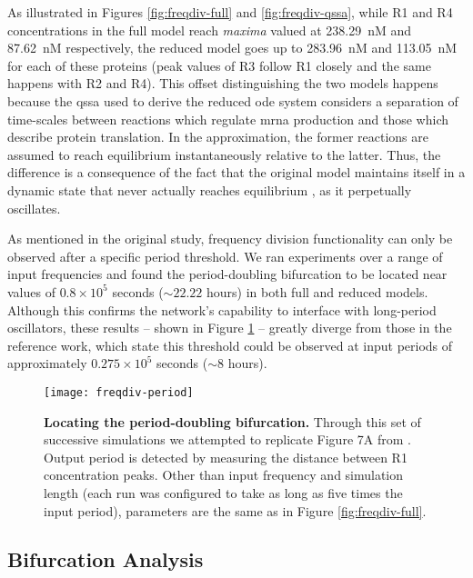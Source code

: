     As illustrated in Figures \ref{fig:freqdiv-full} and \ref{fig:freqdiv-qssa}, while R1 and R4 concentrations in the full model reach \textit{maxima} valued at \SI{238.29}{\nano M} and \SI{87.62}{\nano M} respectively, the reduced model goes up to \SI{283.96}{\nano M} and \SI{113.05}{\nano M} for each of these proteins (peak values of R3 follow R1 closely and the same happens with R2 and R4).
    This offset distinguishing the two models happens because the \ac{qssa} used to derive the reduced \ac{ode} system considers a separation of time-scales between reactions which regulate \acs{mrna} production and those which describe protein translation.
    In the approximation, the former reactions are assumed to reach equilibrium instantaneously relative to the latter.
    Thus, the difference is a consequence of the fact that the original model maintains itself in a dynamic state that never actually reaches equilibrium \cite{ingalls}, as it perpetually oscillates.

    As mentioned in the original study, frequency division functionality can only be observed after a specific period threshold.
    We ran experiments over a range of input frequencies and found the period-doubling bifurcation to be located near values of $0.8 \times 10^5$ seconds ($\sim 22.22$ hours) in both full and reduced models.
    Although this confirms the network's capability to interface with long-period oscillators, these results -- shown in Figure \ref{fig:freqdiv-period} -- greatly diverge from those in the reference work, which state this threshold could be observed at input periods of approximately $0.275 \times 10^5$ seconds ($\sim 8$ hours).

    \begin{figure}[!htb]
      \centering
      \texttt{[image: freqdiv-period]}
      \caption{\textbf{Locating the period-doubling bifurcation.} Through this set of successive simulations we attempted to replicate Figure 7A from \citet{multif}. Output period is detected by measuring the distance between R1 concentration peaks. Other than input frequency and simulation length (each run was configured to take as long as five times the input period), parameters are the same as in Figure \ref{fig:freqdiv-full}.}
      \label{fig:freqdiv-period}
    \end{figure}


  \subsection{Bifurcation Analysis}

